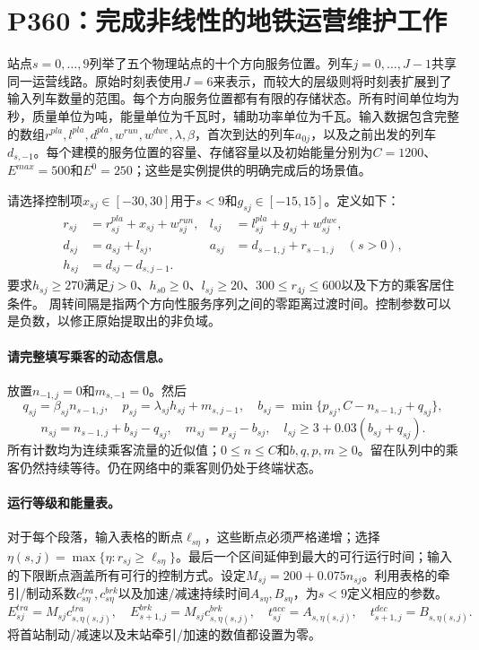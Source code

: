 \documentclass[11pt]{article}
\begin{document}
\section*{P360：完成非线性的地铁运营维护工作}
站点$s=0,\ldots,9$列举了五个物理站点的十个方向服务位置。列车$j=0,\ldots,J-1$共享同一运营线路。原始时刻表使用$J=6$来表示，而较大的层级则将时刻表扩展到了输入列车数量的范围。每个方向服务位置都有有限的存储状态。所有时间单位均为秒，质量单位为吨，能量单位为千瓦时，辅助功率单位为千瓦。输入数据包含完整的数组$r^{pla},l^{pla},d^{pla},w^{run},w^{dwe},
\lambda,\beta$，首次到达的列车$a_{0j}$，以及之前出发的列车$d_{s,-1}$。每个建模的服务位置的容量、存储容量以及初始能量分别为$C=1200$、$E^{max}=500$和$E^0=250$；这些是实例提供的明确完成后的场景值。

请选择控制项$x_{sj}\in[-30,30]$用于$s<9$和$g_{sj}\in[-15,15]$。定义如下：
\begin{align}
r_{sj}&=r^{pla}_{sj}+x_{sj}+w^{run}_{sj},&
l_{sj}&=l^{pla}_{sj}+g_{sj}+w^{dwe}_{sj},\\
d_{sj}&=a_{sj}+l_{sj},&
a_{sj}&=d_{s-1,j}+r_{s-1,j}\quad(s>0),\\
h_{sj}&=d_{sj}-d_{s,j-1}.&&
\end{align}
要求$h_{sj}\ge270$满足$j>0$、$h_{s0}\ge0$、$l_{sj}\ge20$、$300\le r_{4j}\le600$以及下方的乘客居住条件。  
周转间隔是指两个方向性服务序列之间的零距离过渡时间。控制参数可以是负数，以修正原始提取出的非负域。

\paragraph{请完整填写乘客的动态信息。}
放置$n_{-1,j}=0$和$m_{s,-1}=0$。然后
\[
 q_{sj}=\beta_{sj}n_{s-1,j},\quad
 p_{sj}=\lambda_{sj}h_{sj}+m_{s,j-1},\quad
 b_{sj}=\min\{p_{sj},C-n_{s-1,j}+q_{sj}\},
\]
\[
 n_{sj}=n_{s-1,j}+b_{sj}-q_{sj},\quad
 m_{sj}=p_{sj}-b_{sj},\quad
 l_{sj}\ge3+0.03(b_{sj}+q_{sj}).
\]
所有计数均为连续乘客流量的近似值；$0\le n\le C$和$b,q,p,m\ge0$。留在队列中的乘客仍然持续等待。仍在网络中的乘客则仍处于终端状态。

\paragraph{运行等级和能量表。}
对于每个段落，输入表格的断点$\ell_{s\eta}$，这些断点必须严格递增；选择$\eta(s,j)=\max\{\eta:r_{sj}\ge\ell_{s\eta}\}$。最后一个区间延伸到最大的可行运行时间；输入的下限断点涵盖所有可行的控制方式。设定$M_{sj}=200+0.075n_{sj}$。利用表格的牵引/制动系数$c^{tra}_{s\eta},
c^{brk}_{s\eta}$以及加速/减速持续时间$A_{s\eta},B_{s\eta}$，为$s<9$定义相应的参数。
\[
 E^{tra}_{sj}=M_{sj}c^{tra}_{s,\eta(s,j)},\quad
 E^{brk}_{s+1,j}=M_{sj}c^{brk}_{s,\eta(s,j)},\quad
 t^{acc}_{sj}=A_{s,\eta(s,j)},\quad
 t^{dec}_{s+1,j}=B_{s,\eta(s,j)}.
\]
将首站制动/减速以及末站牵引/加速的数值都设置为零。
\end{document}
